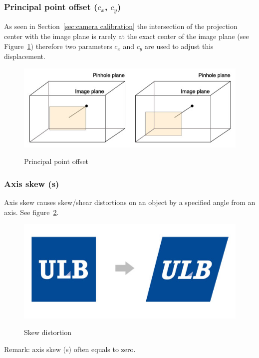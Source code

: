 \subsubsection{Principal point offset ($c_x$, $c_y$)}
As seen in Section~\ref{sec:camera calibration} the intersection of the projection center with the image plane is rarely at the exact center of the image plane (see Figure~\ref{fig:principalpoint}) therefore two parameters $c_x$ and $c_y$ are used to adjust this displacement.

\begin{figure}
\caption{Principal point offset}
\centering
    \includegraphics[width=1.0\textwidth]{images/principalpoint.jpg}
\label{fig:principalpoint}
\end{figure}


\subsubsection{Axis skew (s)}
Axis skew causes skew/shear distortions on an object by a specified angle from an axis. See figure~\ref{fig:ulbskew}.


\begin{figure}
\caption{Skew distortion}
\centering
    \includegraphics[width=1.0\textwidth]{images/ulbskew.jpg}
\label{fig:ulbskew}
\end{figure}

Remark: axis skew (s) often equals to zero.

